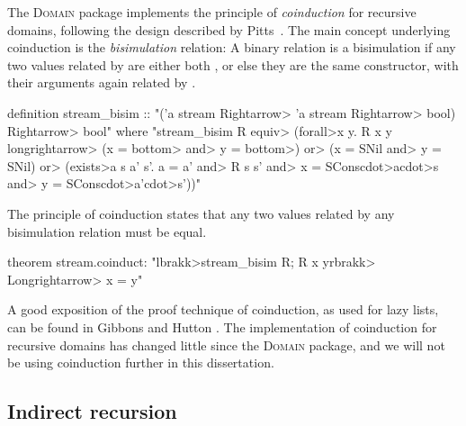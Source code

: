 The \textsc{Domain} package implements the principle of \emph{coinduction} for recursive domains, following the design described by Pitts~\cite{Pitts1994}. The main concept underlying coinduction is the \emph{bisimulation} relation: A binary relation  is a bisimulation if any two values related by  are either both , or else they are the same constructor, with their arguments again related by .
%
\begin{isacode}
definition stream_bisim :: "('a stream \<Rightarrow> 'a stream \<Rightarrow> bool) \<Rightarrow> bool"
  where "stream_bisim R \<equiv> (\<forall>x y. R x y \<longrightarrow>
    (x = \<bottom> \<and> y = \<bottom>) \<or>
    (x = SNil \<and> y = SNil) \<or>
    (\<exists>a s a' s'. a = a' \<and> R s s' \<and> x = SCons\<cdot>a\<cdot>s \<and> y = SCons\<cdot>a'\<cdot>s'))"
\end{isacode}
%
The principle of coinduction states that any two values related by any bisimulation relation must be equal.
%
\begin{isacode}
theorem stream.coinduct: "\<lbrakk>stream_bisim R; R x y\<rbrakk> \<Longrightarrow> x = y"
\end{isacode}
%
A good exposition of the proof technique of coinduction, as used for lazy lists, can be found in Gibbons and Hutton \cite{Gibbons2005}. The implementation of coinduction for recursive domains has changed little since the  \textsc{Domain} package, and we will not be using coinduction further in this dissertation.

\subsection{Indirect recursion}

